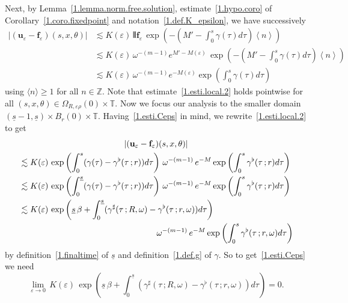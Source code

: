 \documentclass[AHL,Unicode,longabstracts,published]{cedram}
\theoremstyle{plain}
\newcommand*\e{\varepsilon}
\newcommand*\Z{{\mathbb Z}}
\newcommand*\g{\gamma}
\newcommand{\ubf}{{\mathbf u}}
\newcommand*\f{{\mathbf f}}
\newcommand*\und{\underline}
\DeclarePairedDelimiter{\VERT}{|\mkern -1.6mu|\mkern -1.6mu|}{|\mkern -1.6mu|\mkern -1.6mu|}
\begin{document}
Next, by Lemma~\ref{1.lemma.norm.free.solution}, estimate~\eqref{1.hypo.coro} of Corollary~\ref{1.coro.fixedpoint} and notation~\eqref{1.def.K_epsilon}, we have successively
\begin{equation}
\begin{aligned}\label{1.esti.local.2}
|(\ubf_{\e}-\f_{\e})(s,x,\theta)| & \lesssim K(\e)\,\VERT{\f_{\e}}\,\exp\left(-\left(M'- \int_{0}^{s} \g(\tau) d\tau \right) \left<n\right> \right)\\
& \lesssim K(\e)\, \omega^{-(m-1)} e^{M'-M(\e)}\,\exp\left(-\left(M'- \int_{0}^{s} \g(\tau) d\tau \right) \left<n\right> \right)\\
& \lesssim K(\e)\, \omega^{-(m-1)} e^{-M(\e)} \exp\left(\int_{0}^{s} \g(\tau) d\tau \right) 
\end{aligned}
\end{equation}
using $\langle n \rangle \geq 1$ for all $n\in\Z$. Note that estimate~\eqref{1.esti.local.2} holds pointwise for all $(s,x,\theta)\in\Omega_{R,\e\rho}(0)\times\mathbb{T} $. Now we focus our analysis to the smaller domain $(\und{s} - 1, \und{s}) \times B_{r}(0) \times \mathbb{T}$. Having~\eqref{1.esti.Ceps} in mind, we rewrite~\eqref{1.esti.local.2} to get
\begin{multline}\label{1.esti.local}
|(\ubf_{\e}-\f_{\e})(s,x,\theta)| \\
\begin{aligned}
& \lesssim K(\e)\,\exp\left(\int_{0}^{s} (\g(\tau) - \g^{\flat}(\tau\,;r)) d\tau \right) \,\omega^{-(m-1)}\,e^{-M} \exp \left(\int_{0}^{s} \g^{\flat}(\tau\,;r) d\tau \right) \\
& \lesssim K(\e)\,\exp\left(\int_{0}^{\und{s}} (\g(\tau) - \g^{\flat}(\tau\,;r)) d\tau \right) \,\omega^{-(m-1)}\,e^{-M} \exp \left(\int_{0}^{s} \g^{\flat}(\tau\,;r) d\tau \right) \\
& \lesssim K(\e)\,\exp\left(\und{s}\,\beta + \int_{0}^{\und{s}} (\g^{\sharp}(\tau\,;R, \omega) - \g^{\flat}(\tau\,;r, \omega)) d\tau \right) \\
& \mkern 295mu \omega^{-(m-1)}\,e^{-M} \exp \left(\int_{0}^{s} \g^{\flat}(\tau\,;r, \omega) d\tau \right) 
\end{aligned}
\end{multline}
by definition~\eqref{1.finaltime} of $\und{s}$ and definition~\eqref{1.def.g} of $\g$. So to get~\eqref{1.esti.Ceps} we need
\[
\lim_{\e\to0} \,K(\e)\,\exp\left(\und{s}\,\beta + \int_{0}^{\und{s}} (\g^{\sharp}(\tau\,;R, \omega) - \g^{\flat}(\tau\,;r, \omega)) d\tau \right) = 0.
\]
\end{document}
